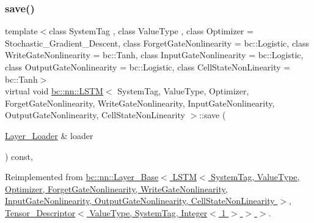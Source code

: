 \mbox{\label{structbc_1_1nn_1_1LSTM_ae74b5038cc10d0ad236be07704d2999a}} 
\subsubsection{\texorpdfstring{save()}{save()}}
{\footnotesize\ttfamily template$<$class System\+Tag , class Value\+Type , class Optimizer  = Stochastic\+\_\+\+Gradient\+\_\+\+Descent, class Forget\+Gate\+Nonlinearity  = bc\+::\+Logistic, class Write\+Gate\+Nonlinearity  = bc\+::\+Tanh, class Input\+Gate\+Nonlinearity  = bc\+::\+Logistic, class Output\+Gate\+Nonlinearity  = bc\+::\+Logistic, class Cell\+State\+Non\+Linearity  = bc\+::\+Tanh$>$ \\
virtual void \hyperlink{structbc_1_1nn_1_1LSTM}{bc\+::nn\+::\+L\+S\+TM}$<$ System\+Tag, Value\+Type, Optimizer, Forget\+Gate\+Nonlinearity, Write\+Gate\+Nonlinearity, Input\+Gate\+Nonlinearity, Output\+Gate\+Nonlinearity, Cell\+State\+Non\+Linearity $>$\+::save (\begin{DoxyParamCaption}\item[{\hyperlink{structbc_1_1nn_1_1Layer__Loader}{Layer\+\_\+\+Loader} \&}]{loader }\end{DoxyParamCaption}) const\hspace{0.3cm}{\ttfamily [inline]}, {\ttfamily [virtual]}}



Reimplemented from \hyperlink{structbc_1_1nn_1_1Layer__Base_a9613e51db3c27e64ced09e41d2e7f15c}{bc\+::nn\+::\+Layer\+\_\+\+Base$<$ L\+S\+T\+M$<$ System\+Tag, Value\+Type, Optimizer, Forget\+Gate\+Nonlinearity, Write\+Gate\+Nonlinearity, Input\+Gate\+Nonlinearity, Output\+Gate\+Nonlinearity, Cell\+State\+Non\+Linearity $>$, Tensor\+\_\+\+Descriptor$<$ Value\+Type, System\+Tag, Integer$<$ 1 $>$ $>$ $>$}.

\mbox{\label{structbc_1_1nn_1_1LSTM_a270951d7af7ffcf061d02bbb046a4dc7}} 
